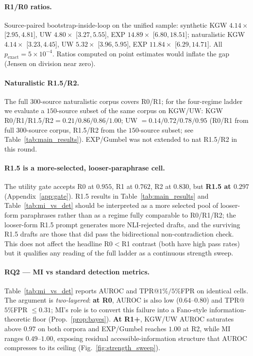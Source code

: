 \documentclass[11pt]{article}
\begin{document}
\paragraph{R1/R0 ratios.} Source-paired bootstrap-inside-loop on the
unified sample: synthetic KGW $4.14\times$ [$2.95,4.81$], UW
$4.80\times$ [$3.27,5.55$], EXP $14.89\times$ [$6.80,18.51$];
naturalistic KGW $4.14\times$ [$3.23,4.45$], UW $5.32\times$
[$3.96,5.95$], EXP $11.84\times$ [$6.29,14.71$].
All $p_{\mathrm{exact}}{=}5{\times}10^{-4}$. Ratios computed on point
estimates would inflate the gap (Jensen on division near zero).

\paragraph{Naturalistic R1.5/R2.} The full $300$-source naturalistic corpus
covers R0/R1; for the four-regime ladder we evaluate a $150$-source
subset of the same corpus on KGW/UW: KGW R0/R1/R1.5/R2$=0.21/0.86/0.86/1.00$;
UW $=0.14/0.72/0.78/0.95$ (R0/R1 from full $300$-source corpus, R1.5/R2
from the $150$-source subset; see Table~\ref{tab:main_results}).
EXP/Gumbel was not extended to nat R1.5/R2 in this round.

\paragraph{R1.5 is a more-selected, looser-paraphrase cell.}
The utility gate accepts R0 at $0.955$, R1 at $0.762$, R2 at $0.830$, but
\textbf{R1.5 at $0.297$} (Appendix~\ref{app:gate}). R1.5 results in
Table~\ref{tab:main_results} and Table~\ref{tab:mi_vs_det} should be
interpreted as a more selected pool of looser-form paraphrases rather than
as a regime fully comparable to R0/R1/R2; the looser-form R1.5 prompt
generates more NLI-rejected drafts, and the surviving R1.5 drafts are
those that did pass the bidirectional non-contradiction check. This does
not affect the headline R0$<$R1 contrast (both have high pass rates) but it
qualifies any reading of the full ladder as a continuous strength sweep.

\paragraph{RQ2 --- MI vs standard detection metrics.}

Table~\ref{tab:mi_vs_det} reports AUROC and TPR@$1\%/5\%$FPR on identical
cells. The argument is \emph{two-layered}: \textbf{at R0}, AUROC is also
low ($0.64$--$0.80$) and TPR@$5\%$FPR $\leq 0.31$; MI's role is to
convert this failure into a Fano-style information-theoretic floor
(Prop.~\ref{prop:bayes}). \textbf{At R1+}, KGW/UW AUROC saturates above
$0.97$ on both corpora and EXP/Gumbel reaches $1.00$ at R2, while MI ranges
$0.49$--$1.00$, exposing residual accessible-information structure that
AUROC compresses to its ceiling (Fig.~\ref{fig:strength_sweep}).
\end{document}
